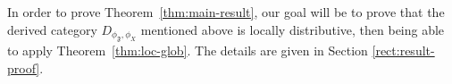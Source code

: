 \documentclass[sigplan,9pt]{acmart}\settopmatter{printfolios=true,printccs=false,printacmref=false}
\newcounter{thm}
\theoremstyle{definition}
\newcommand{\La}[0]{{\mathcal{L}}}
\newcommand{\Ff}[0]{{\mathfrak{F}}}
\begin{document}
In order to prove Theorem~\ref{thm:main-result}, our goal will be to prove that the derived category $D_{\phi_\Ff, \phi_X}$ mentioned above is locally distributive, then being able to apply Theorem~\ref{thm:loc-glob}.
The details are given in Section \ref{rect:result-proof}.




\end{document}
